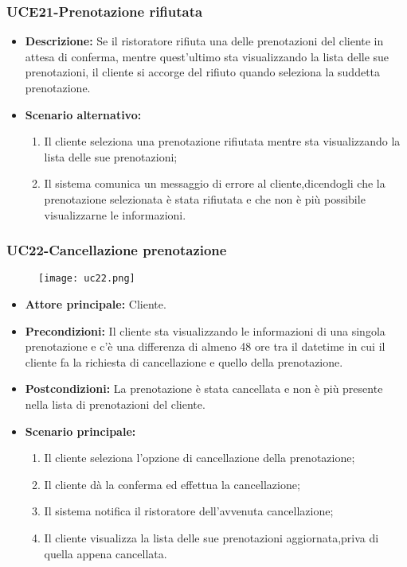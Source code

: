 \subsubsection{UCE21-Prenotazione rifiutata} %
\begin{itemize}
    \item \textbf{Descrizione: }Se il ristoratore rifiuta una delle prenotazioni del cliente in attesa di conferma,
    mentre quest'ultimo sta visualizzando la lista delle sue prenotazioni, il cliente si accorge del rifiuto quando
    seleziona la suddetta prenotazione.
    \item \textbf{Scenario alternativo: }
    \begin{enumerate}
        \item Il cliente seleziona una prenotazione rifiutata mentre sta visualizzando la lista
        delle sue prenotazioni;
        \item Il sistema comunica un messaggio di errore al cliente,dicendogli che la prenotazione selezionata
        è stata rifiutata e che non è più possibile visualizzarne le informazioni.
    \end{enumerate}
\end{itemize}

\pagebreak
\subsubsection{UC22-Cancellazione prenotazione}
\begin{figure}[h] \texttt{[image: uc22.png]} \end{figure}
\begin{itemize}
    \item \textbf{Attore principale: } Cliente.
    \item \textbf{Precondizioni: }Il cliente sta visualizzando le informazioni di una singola prenotazione
    e c'è una differenza di almeno 48 ore tra il datetime in cui il cliente fa la richiesta di cancellazione e quello della prenotazione.
    \item \textbf{Postcondizioni: }La prenotazione è stata cancellata e non è più presente nella lista di prenotazioni
    del cliente.
    \item \textbf{Scenario principale:}
        \begin{enumerate}
            \item Il cliente seleziona l'opzione di cancellazione della prenotazione;
            \item Il cliente dà la conferma ed effettua la cancellazione;
            \item Il sistema notifica il ristoratore dell'avvenuta cancellazione;
            \item Il cliente visualizza la lista delle sue prenotazioni aggiornata,priva di quella appena
            cancellata.
        \end{enumerate}
\end{itemize}


